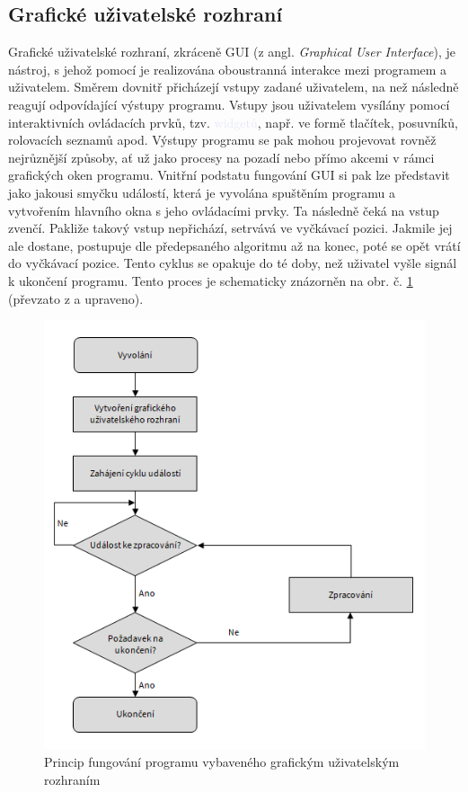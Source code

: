 \documentclass[a4paper, 12pt]{article}
\begin{document}
\subsection{Grafické uživatelské rozhraní} \label{sec:GUI}
Grafické uživatelské rozhraní, zkráceně GUI (z angl. \textit{Graphical User Interface}), je nástroj, s jehož pomocí je realizována oboustranná interakce mezi programem a uživatelem. Směrem dovnitř přicházejí vstupy zadané uživatelem, na než následně reagují odpovídající výstupy programu. Vstupy jsou uživatelem vysílány pomocí interaktivních ovládacích prvků, tzv. \textcolor{lavender}{widgetů}, např. ve formě tlačítek, posuvníků, rolovacích seznamů apod. Výstupy programu se pak mohou projevovat rovněž nejrůznější způsoby, ať už jako procesy na pozadí nebo přímo akcemi v rámci grafických oken programu. Vnitřní podstatu fungování GUI si pak lze představit jako jakousi  smyčku událostí, která je vyvolána spuštěním programu a vytvořením hlavního okna s jeho ovládacími prvky. Ta následně čeká na vstup zvenčí. Pakliže takový vstup nepřichází, setrvává ve vyčkávací pozici. Jakmile jej ale dostane, postupuje dle předepsaného algoritmu až na konec, poté se opět vrátí do vyčkávací pozice. Tento cyklus se opakuje do té doby, než uživatel vyšle signál k ukončení programu. Tento proces je schematicky znázorněn na obr. č. \ref{fig:Gui} (převzato z \cite{Python3Summerfield:2} a upraveno).
\begin{figure}[hbt!]
    \centering
    \includegraphics{gui_princip.png}
    \caption{Princip fungování programu vybaveného grafickým uživatelským rozhraním}
    \label{fig:Gui}
\end{figure}
\end{document}
